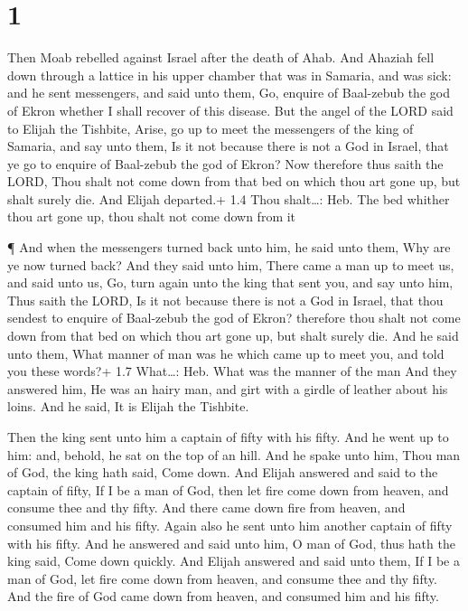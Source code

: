 \hypertarget{section}{%
\section{1}\label{section}}

 Then Moab rebelled against Israel after the death of Ahab.
 And Ahaziah fell down through a lattice in his upper
chamber that was in Samaria, and was sick: and he sent messengers, and
said unto them, Go, enquire of Baal-zebub the god of Ekron whether I
shall recover of this disease.  But the angel of the LORD
said to Elijah the Tishbite, Arise, go up to meet the messengers of the
king of Samaria, and say unto them, Is it not because there is not a God
in Israel, that ye go to enquire of Baal-zebub the god of Ekron?
 Now therefore thus saith the LORD, Thou shalt not come down
from that bed on which thou art gone up, but shalt surely die. And
Elijah departed.+ 1.4 Thou shalt\ldots: Heb. The bed whither thou art
gone up, thou shalt not come down from it

 ¶ And when the messengers turned back unto him, he said
unto them, Why are ye now turned back?  And they said unto
him, There came a man up to meet us, and said unto us, Go, turn again
unto the king that sent you, and say unto him, Thus saith the LORD, Is
it not because there is not a God in Israel, that thou sendest to
enquire of Baal-zebub the god of Ekron? therefore thou shalt not come
down from that bed on which thou art gone up, but shalt surely die.
 And he said unto them, What manner of man was he which came
up to meet you, and told you these words?+ 1.7 What\ldots: Heb. What was
the manner of the man  And they answered him, He was an
hairy man, and girt with a girdle of leather about his loins. And he
said, It is Elijah the Tishbite.

 Then the king sent unto him a captain of fifty with his
fifty. And he went up to him: and, behold, he sat on the top of an hill.
And he spake unto him, Thou man of God, the king hath said, Come down.
 And Elijah answered and said to the captain of fifty, If I
be a man of God, then let fire come down from heaven, and consume thee
and thy fifty. And there came down fire from heaven, and consumed him
and his fifty.  Again also he sent unto him another captain
of fifty with his fifty. And he answered and said unto him, O man of
God, thus hath the king said, Come down quickly.  And
Elijah answered and said unto them, If I be a man of God, let fire come
down from heaven, and consume thee and thy fifty. And the fire of God
came down from heaven, and consumed him and his fifty.

